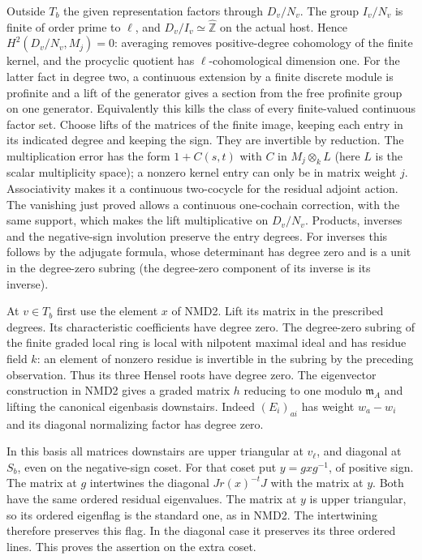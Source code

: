 Outside $T_b$ the given representation factors through
$D_v/N_v$. The group $I_v/N_v$ is finite of order prime to
$\ell$, and $D_v/I_v\simeq\widehat{\mathbb Z}$ on the actual host.
Hence $H^2(D_v/N_v,M_j)=0$: averaging removes positive-degree
cohomology of the finite kernel, and the procyclic quotient has
$\ell$-cohomological dimension one. For the latter fact in degree
two, a continuous extension by a finite discrete module is
profinite and a lift of the generator gives a section from the
free profinite group on one generator. Equivalently this kills
the class of every finite-valued continuous factor set.
Choose lifts of the matrices of the finite image, keeping each
entry in its indicated degree and keeping the sign. They are
invertible by reduction. The multiplication error has the form
$1+C(s,t)$ with $C$ in $M_j\otimes_k L$ (here $L$ is the scalar
multiplicity space); a nonzero kernel entry can only be in matrix
weight $j$. Associativity makes it a continuous two-cocycle for
the residual adjoint action. The vanishing just proved allows
a continuous one-cochain correction, with the same support, which
makes the lift multiplicative on $D_v/N_v$. Products, inverses
and the negative-sign involution preserve the entry degrees.
For inverses this follows by the adjugate formula, whose determinant
has degree zero and is a unit in the degree-zero subring
(the degree-zero component of its inverse is its inverse).

At $v\in T_b$ first use the element $x$ of NMD2. Lift its matrix
in the prescribed degrees. Its characteristic coefficients have
degree zero. The degree-zero subring of the finite graded local
ring is local with nilpotent maximal ideal and has residue field
$k$: an element of nonzero residue is invertible in the subring
by the preceding observation. Thus its three Hensel roots have
degree zero. The eigenvector construction in NMD2 gives a graded
matrix $h$ reducing to one modulo $\mathfrak m_A$ and lifting the
canonical eigenbasis downstairs. Indeed $(E_i)_{ai}$ has weight
$w_a-w_i$ and its diagonal normalizing factor has degree zero.

In this basis all matrices downstairs are upper triangular at
$v_\ell$, and diagonal at $S_b$, even on the negative-sign coset.
For that coset put $y=gxg^{-1}$, of positive sign. The matrix at
$g$ intertwines the diagonal $Jr(x)^{-t}J$ with the matrix at $y$.
Both have the same ordered residual eigenvalues. The matrix at $y$
is upper triangular, so its ordered eigenflag is the standard one,
as in NMD2. The intertwining therefore preserves this flag. In the
diagonal case it preserves its three ordered lines. This proves the
assertion on the extra coset.

